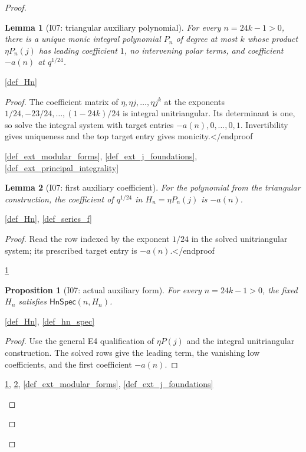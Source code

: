 \documentclass[11pt,a4paper]{article}
\numberwithin{equation}{section}
\theoremstyle{plain}\newtheorem{theorem}{Theorem}[section]\newaliascnt{proposition}{theorem}\newtheorem{proposition}[proposition]{Proposition}\aliascntresetthe{proposition}\newaliascnt{lemma}{theorem}\newtheorem{lemma}[lemma]{Lemma}\aliascntresetthe{lemma}
\theoremstyle{definition}\newaliascnt{definition}{theorem}\newtheorem{definition}[definition]{Definition}\aliascntresetthe{definition}\newaliascnt{notation}{theorem}\newtheorem{notation}[notation]{Notation}\aliascntresetthe{notation}
\providecommand{\lean}[1]{}\providecommand{\leanok}{}
\begin{document}
\begin{proof}
\begin{lemma}[I07: triangular auxiliary polynomial]\label{lem_i07_triangular_polynomial}\lean{SptCM.Analytic.Repaired.existsUnique_triangularPolynomial}\leanok
For every $n=24k-1>0$, there is a unique monic integral polynomial $P_n$
of degree at most $k$ whose product $\eta P_n(j)$ has leading coefficient
$1$, no intervening polar terms, and coefficient $-a(n)$ at $q^{1/24}$.
\end{lemma}
\begin{uses-statement}\ref{def_Hn}\end{uses-statement}
\begin{proof}The coefficient matrix of
$\eta,\eta j,\ldots,\eta j^k$ at the exponents
$1/24,-23/24,\ldots,(1-24k)/24$ is integral unitriangular.  Its determinant
is one, so solve the integral system with target entries $-a(n),0,\ldots,0,1$.
Invertibility gives uniqueness and the top target entry gives monicity.</end{proof}
\begin{uses-proof}\ref{def_ext_modular_forms}, \ref{def_ext_j_foundations}, \ref{def_ext_principal_integrality}\end{uses-proof}

\begin{lemma}[I07: first auxiliary coefficient]\label{lem_i07_first_coefficient}\lean{SptCM.Analytic.Repaired.auxiliaryHn_first_coefficient}\leanok
For the polynomial from the triangular construction, the coefficient of $q^{1/24}$ in $H_n=\eta P_n(j)$ is $-a(n)$.
\end{lemma}
\begin{uses-statement}\ref{def_Hn}, \ref{def_series_f}\end{uses-statement}
\begin{proof}Read the row indexed by the exponent $1/24$ in the solved
unitriangular system; its prescribed target entry is $-a(n)$.</end{proof}
\begin{uses-proof}\ref{lem_i07_triangular_polynomial}\end{uses-proof}

\begin{proposition}[I07: actual auxiliary form]\label{prop_i07_hn_actual}\lean{SptCM.Analytic.Repaired.auxiliaryForm_spec}\leanok
For every $n=24k-1>0$, the fixed $H_n$ satisfies $\mathsf{HnSpec}(n,H_n)$.
\end{proposition}
\begin{uses-statement}\ref{def_Hn}, \ref{def_hn_spec}\end{uses-statement}
\begin{proof}
Use the general E4 qualification of $\eta P(j)$ and the integral
unitriangular construction.  The solved rows give the leading term, the
vanishing low coefficients, and the first coefficient $-a(n)$.
\end{proof}
\begin{uses-proof}\ref{lem_i07_triangular_polynomial}, \ref{lem_i07_first_coefficient}, \ref{def_ext_modular_forms}, \ref{def_ext_j_foundations}\end{uses-proof}


\end{proof}
\end{proof}
\end{proof}
\end{document}
